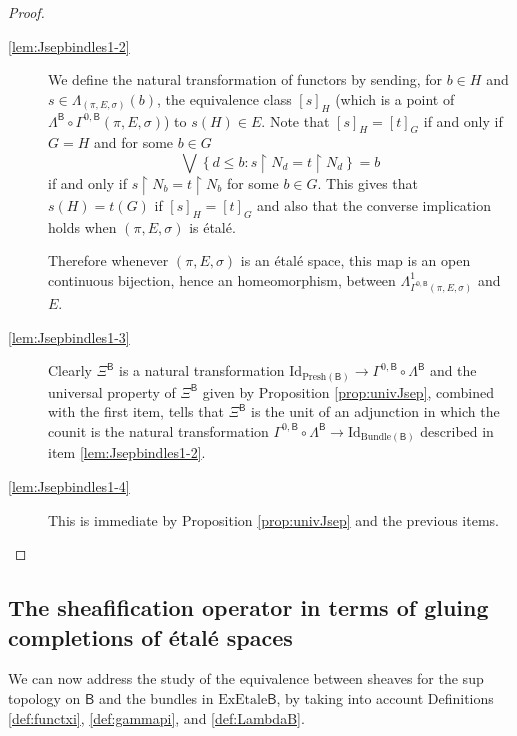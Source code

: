 \documentclass[11pt]{amsart}
\newcommand{\Id}{\textrm{Id}}
\newcommand{\Presh}{\textrm{Presh}}
\newcommand{\bundle}{\textrm{Bundle}}
\newcommand{\exetale}{\textrm{ExEtale}}
\theoremstyle{plain}
\theoremstyle{definition}
\theoremstyle{plain}
\theoremstyle{remark}
\newcommand{\bool}[1]{\mathsf{#1}}
\newcommand{\bp}[1]{\left\lbrace #1 \right\rbrace}
\newcommand{\0}{\mathsf{0}}
\renewcommand{\1}{\mathsf{1}}
\renewcommand{\2}{\mathsf{2}}
\theoremstyle{definition}
\begin{document}
\begin{proof}
\emph{}

\begin{description}
\item[\ref{lem:Jsepbindles1-2}]
We define the natural transformation of functors by sending, for $b\in H$ and $s\in\Lambda_{(\pi, E, \sigma)}(b)$, the equivalence class $[s]_{ H}$ (which is a point of $\Lambda^{\bool{B}}\circ\Gamma^{0,\bool{B}}(\pi,E,\sigma)$) to
$s(H)\in E$. Note that $[s]_{H}=[t]_{G}$ if and only if $G=H$ and for some $b\in G$
\[
\bigvee\bp{d\leq b: s\restriction N_d=t\restriction N_d}=b
\]
if and only if  $s\restriction N_b=t\restriction N_b$ for some $b\in G$. 
This gives that $s(H)=t(G)$ if $[s]_H=[t]_G$ and also that the converse implication holds when $(\pi,E,\sigma)$ is \'etal\'e.

Therefore whenever $(\pi, E, \sigma)$ is an \'etal\'e space, this map is an open continuous bijection, hence an homeomorphism, between
$\Lambda^1_{\Gamma^{0,\bool{B}}(\pi,E,\sigma)}$ and
$E$.
\item[\ref{lem:Jsepbindles1-3}]
Clearly $\Xi^{\bool{B}}$ is a natural transformation $\Id_{\Presh(\bool{B})}\to \Gamma^{0,\bool{B}}\circ\Lambda^{\bool{B}}$ and the universal property of $\Xi^{\bool{B}}$ given by Proposition \ref{prop:univJsep}, combined with the first item, tells that $\Xi^{\bool{B}}$ is the unit of an adjunction in which the counit is the natural transformation 
$\Gamma^{0,\bool{B}}\circ\Lambda^{\bool{B}}\to\Id_{\bundle(\bool{B})}$ described in item \ref{lem:Jsepbindles1-2}.
\item[\ref{lem:Jsepbindles1-4}]
This is immediate by Proposition \ref{prop:univJsep} and the previous items.

\end{description}


\end{proof}





\subsection{The sheafification operator in terms of gluing completions of \'etal\'e spaces}

We can now address the study of the equivalence between sheaves for the sup topology on $\bool{B}$ and the bundles in $\exetale{\bool{B}}$, by taking into account 
Definitions \ref{def:functxi}, \ref{def:gammapi}, and \ref{def:LambdaB}. 
\end{document}
